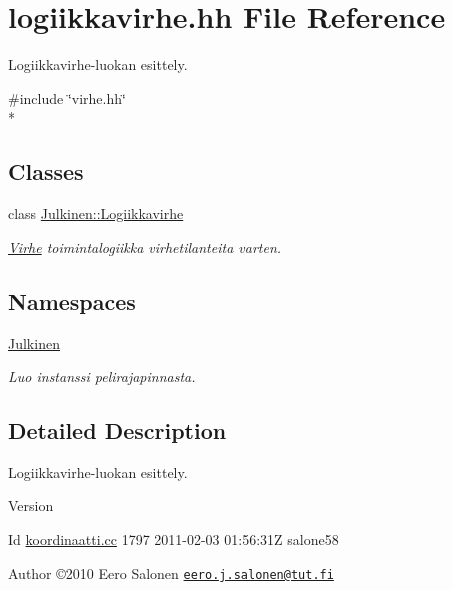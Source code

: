 \hypertarget{logiikkavirhe_8hh}{}\section{logiikkavirhe.\+hh File Reference}
\label{logiikkavirhe_8hh}


Logiikkavirhe-\/luokan esittely.  


{\ttfamily \#include \char`\"{}virhe.\+hh\char`\"{}}\\*
\subsection*{Classes}
\begin{DoxyCompactItemize}
\item 
class \hyperlink{class_julkinen_1_1_logiikkavirhe}{Julkinen\+::\+Logiikkavirhe}
\begin{DoxyCompactList}\small\item\em \hyperlink{class_julkinen_1_1_virhe}{Virhe} toimintalogiikka virhetilanteita varten. \end{DoxyCompactList}\end{DoxyCompactItemize}
\subsection*{Namespaces}
\begin{DoxyCompactItemize}
\item 
 \hyperlink{namespace_julkinen}{Julkinen}
\begin{DoxyCompactList}\small\item\em Luo instanssi pelirajapinnasta. \end{DoxyCompactList}\end{DoxyCompactItemize}


\subsection{Detailed Description}
Logiikkavirhe-\/luokan esittely. 

\begin{DoxyVersion}{Version}

\end{DoxyVersion}
\begin{DoxyParagraph}{Id}
\hyperlink{koordinaatti_8cc}{koordinaatti.\+cc} 1797 2011-\/02-\/03 01\+:56\+:31\+Z salone58 
\end{DoxyParagraph}


\begin{DoxyAuthor}{Author}
©2010 Eero Salonen \href{mailto:eero.j.salonen@tut.fi}{\tt eero.\+j.\+salonen@tut.\+fi} 
\end{DoxyAuthor}
